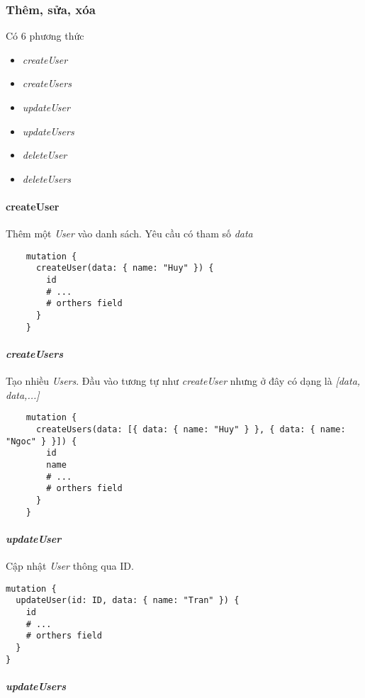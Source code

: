 \subsubsection {Thêm, sửa, xóa}

Có 6 phương thức
\begin{itemize}
	\item \emph{createUser}
	\item \emph{createUsers}
	\item \emph{updateUser}
	\item \emph{updateUsers}
	\item \emph{deleteUser}
	\item \emph{deleteUsers}
\end{itemize}
\paragraph{createUser}

Thêm một \emph{User} vào danh sách. Yêu cầu có tham số \emph{data}

\begin{lstlisting}
	mutation {
	  createUser(data: { name: "Huy" }) {
	    id
	    # ...
	    # orthers field
	  }
	}
\end{lstlisting}

\paragraph{\emph{createUsers}}

Tạo nhiều \emph{Users}. Đầu vào tương tự như \emph{createUser} nhưng ở đây có dạng là \emph{[data, data,...]}

\begin{lstlisting}
	mutation {
	  createUsers(data: [{ data: { name: "Huy" } }, { data: { name: "Ngoc" } }]) {
	    id
	    name
	    # ...
	    # orthers field
	  }
	}
\end{lstlisting}

\paragraph{\emph{updateUser}}

Cập nhật \emph{User} thông qua ID.

\begin{lstlisting}
mutation {
  updateUser(id: ID, data: { name: "Tran" }) {
    id
    # ...
    # orthers field
  }
}
\end{lstlisting}

\paragraph{\emph{updateUsers}}

